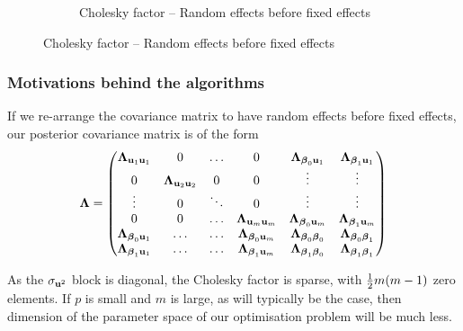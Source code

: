 \documentclass{beamer}
\begin{document}
\begin{frame}
\begin{itemize}
\begin{figure}
\begin{subfigure}{0.4\textwidth}
							\caption{\tiny Cholesky factor -- Random effects before fixed effects}
						\end{subfigure}
					\end{figure}
	\end{itemize}
\end{frame}

\begin{frame}
	\frametitle{Motivations behind the algorithms}
	If we re-arrange the covariance matrix to have random effects before
	fixed effects, our posterior covariance matrix is of the form
	\begin{align*} {\boldsymbol\Lambda} =
		\begin{pmatrix}
		{\boldsymbol\Lambda}_{{\bf u}_1 {\bf u}_1}    & 0                      & \ldots & 0                          & {\boldsymbol \Lambda}_{{\boldsymbol \beta}_0 {\bf u}_1}    & {\boldsymbol \Lambda}_{{\boldsymbol \beta}_1 {\bf u}_1}    \\
		0                         & {\boldsymbol \Lambda}_{{\bf u}_2 {\bf u}_2} & 0      & 0                          & \vdots                       & \vdots                       \\
		\vdots                    & 0                      & \ddots & 0                          & \vdots                       & \vdots                       \\
		0                         & 0                      & \ldots & {\boldsymbol \Lambda}_{{\bf u}_{m} {\bf u}_{m}} & {\boldsymbol \Lambda}_{{\boldsymbol \beta}_0 {\bf u}_{m}}  & {\boldsymbol \Lambda}_{{\boldsymbol \beta}_1 {\bf u}_{m}}  \\
		{\boldsymbol \Lambda}_{{\boldsymbol \beta}_0 {\bf u}_1} & \ldots                 & \ldots & {\boldsymbol \Lambda}_{{\boldsymbol \beta}_0 {\bf u}_m}  & {\boldsymbol \Lambda}_{{\boldsymbol \beta}_0 {\boldsymbol \beta}_0} & {\boldsymbol \Lambda}_{{\boldsymbol \beta}_0 {\boldsymbol \beta}_1} \\
		{\boldsymbol \Lambda}_{{\boldsymbol \beta}_1 {\bf u}_1} & \ldots                 & \ldots & {\boldsymbol \Lambda}_{{\boldsymbol \beta}_1 {\bf u}_m}  & {\boldsymbol \Lambda}_{{\boldsymbol \beta}_1 {\boldsymbol \beta}_0} & {\boldsymbol \Lambda}_{{\boldsymbol \beta}_1 {\boldsymbol \beta}_1} 
		\end{pmatrix}
	\end{align*}
	
	As the $\sigma_{{\bf u}^2}$ block is diagonal, the Cholesky factor is 
	sparse, with $\tfrac{1}{2} m(m-1)$ zero elements. If $p$ is small
	and $m$ is large, as will typically be the case, then dimension of the parameter space of our optimisation
	problem will be much less.
\end{frame}
\end{document}
